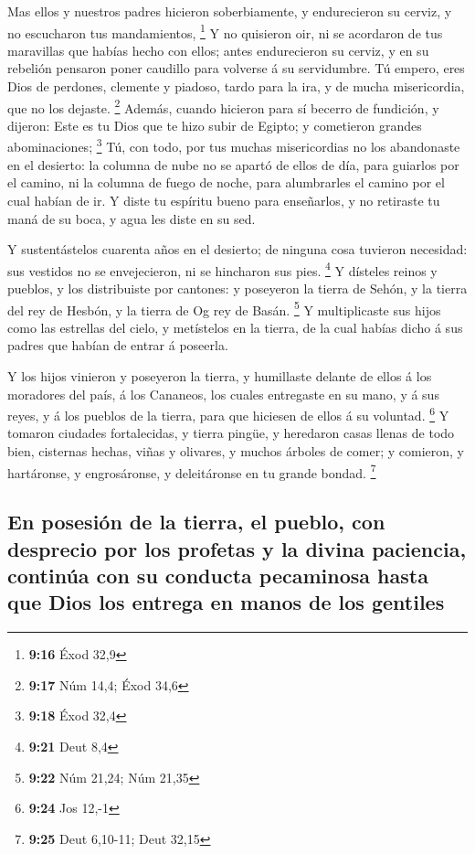  Mas ellos y nuestros padres hicieron soberbiamente, y
endurecieron su cerviz, y no escucharon tus mandamientos, \footnote{\textbf{9:16}
  Éxod 32,9}  Y no quisieron oir, ni se acordaron de tus
maravillas que habías hecho con ellos; antes endurecieron su cerviz, y
en su rebelión pensaron poner caudillo para volverse á su servidumbre.
Tú empero, eres Dios de perdones, clemente y piadoso, tardo para la ira,
y de mucha misericordia, que no los dejaste. \footnote{\textbf{9:17} Núm
  14,4; Éxod 34,6}  Además, cuando hicieron para sí becerro
de fundición, y dijeron: Este es tu Dios que te hizo subir de Egipto; y
cometieron grandes abominaciones; \footnote{\textbf{9:18} Éxod 32,4}
 Tú, con todo, por tus muchas misericordias no los
abandonaste en el desierto: la columna de nube no se apartó de ellos de
día, para guiarlos por el camino, ni la columna de fuego de noche, para
alumbrarles el camino por el cual habían de ir.  Y diste tu
espíritu bueno para enseñarlos, y no retiraste tu maná de su boca, y
agua les diste en su sed.

 Y sustentástelos cuarenta años en el desierto; de ninguna
cosa tuvieron necesidad: sus vestidos no se envejecieron, ni se
hincharon sus pies. \footnote{\textbf{9:21} Deut 8,4}  Y
dísteles reinos y pueblos, y los distribuiste por cantones: y poseyeron
la tierra de Sehón, y la tierra del rey de Hesbón, y la tierra de Og rey
de Basán. \footnote{\textbf{9:22} Núm 21,24; Núm 21,35}  Y
multiplicaste sus hijos como las estrellas del cielo, y metístelos en la
tierra, de la cual habías dicho á sus padres que habían de entrar á
poseerla.

 Y los hijos vinieron y poseyeron la tierra, y humillaste
delante de ellos á los moradores del país, á los Cananeos, los cuales
entregaste en su mano, y á sus reyes, y á los pueblos de la tierra, para
que hiciesen de ellos á su voluntad. \footnote{\textbf{9:24} Jos 12,-1}
 Y tomaron ciudades fortalecidas, y tierra pingüe, y
heredaron casas llenas de todo bien, cisternas hechas, viñas y olivares,
y muchos árboles de comer; y comieron, y hartáronse, y engrosáronse, y
deleitáronse en tu grande bondad. \footnote{\textbf{9:25} Deut 6,10-11;
  Deut 32,15}

\hypertarget{en-posesiuxf3n-de-la-tierra-el-pueblo-con-desprecio-por-los-profetas-y-la-divina-paciencia-continuxfaa-con-su-conducta-pecaminosa-hasta-que-dios-los-entrega-en-manos-de-los-gentiles}{%
\subsection{En posesión de la tierra, el pueblo, con desprecio por los
profetas y la divina paciencia, continúa con su conducta pecaminosa
hasta que Dios los entrega en manos de los
gentiles}\label{en-posesiuxf3n-de-la-tierra-el-pueblo-con-desprecio-por-los-profetas-y-la-divina-paciencia-continuxfaa-con-su-conducta-pecaminosa-hasta-que-dios-los-entrega-en-manos-de-los-gentiles}}

